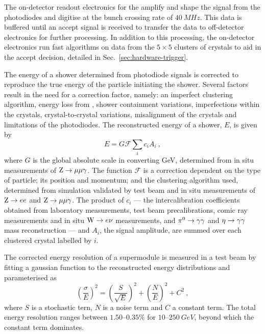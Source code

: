 The on-detector readout electronics for the \ECAL amplify and shape the signal from the photodiodes and digitise at the bunch crossing rate of ${\SI{40}{MHz}}$. This data is buffered until an accept signal is received to transfer the data to off-detector electronics for further processing. In addition to this processing, the on-detector electronics run fast algorithms on data from the ${5\times 5}$ clusters of crystals to aid in the accept decision, detailed in Sec.~\ref{sec:hardware-trigger}.

The energy of a shower determined from photodiode signals is corrected to reproduce the true energy of the particle initiating the shower. Several factors result in the need for a correction factor, namely: an imperfect clustering algorithm, energy loss from \brem, shower containment variations, imperfections within the crystals, crystal-to-crystal variations, misalignment of the crystals and limitations of the photodiodes. The reconstructed energy of a shower, $E$, is given by
%
\begin{equation}
    E = G\mathcal{F}\sum_i c_i A_i\ ,
\end{equation}
%
where $G$ is the global absolute scale in converting GeV, determined from in situ measurements of ${\mathrm{Z}\rightarrow\mu\mu\gamma}$. The function $\mathcal{F}$ is a correction dependent on the type of particle; its position and momentum; and the clustering algorithm used, determined from simulation validated by test beam and in situ measurements of ${\mathrm{Z}\rightarrow ee}$ and ${\mathrm{Z}\rightarrow\mu\mu\gamma}$. The product of $c_i$ --- the intercalibration coefficients obtained from laboratory measurements, test beam precalibrations, comic ray measurements and in situ ${\mathrm{W}\rightarrow e\nu}$ measurements, and ${\pi^{0}\rightarrow\gamma\gamma}$ and ${\eta\rightarrow\gamma\gamma}$ mass reconstruction --- and $A_i$, the signal amplitude, are summed over each clustered crystal labelled by $i$.

The corrected energy resolution of a supermodule is measured in a test beam by fitting a gaussian function to the reconstructed energy distributions and parameterised as
%
\begin{equation}
    \left(\frac{\sigma}{E}\right)^{2} = \left(\frac{S}{\sqrt{E}} \right)^{2}
    + \left( \frac{N}{E} \right)^{2} + C^2\ ,
\end{equation}
%
where $S$ is a stochastic tern, $N$ is a noise term and $C$ a constant term.  The total energy resolution ranges between {$1.50$--$0.35\%$} for {$10$--$\SI{250}{GeV}$}, beyond which the constant term dominates.


